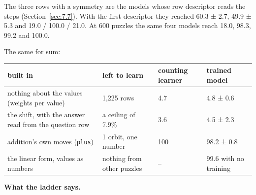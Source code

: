 The three rows with a symmetry are the models whose row descriptor reads the steps (Section~\ref{sec:7.7}). With the first descriptor they reached 60.3 ± 2.7, 49.9 ± 5.3 and 19.0 / 100.0 / 21.0. At 600 puzzles the same four models reach 18.0, 98.3, 99.2 and 100.0.

The same for sum:

\begin{center}\small
\begin{tabularx}{\linewidth}{@{}YYlY@{}}
\toprule
built in & left to learn & counting learner & trained model \\
\midrule
nothing about the values (weights per value) & 1,225 rows & 4.7 & 4.8 ± 0.6 \\
the shift, with the answer read from the question row & a ceiling of 7.9\% & 3.6 & 4.5 ± 2.3 \\
addition's own moves (\texttt{plus}) & 1 orbit, one number & 100 & 98.2 ± 0.8 \\
the linear form, values as numbers & nothing from other puzzles & – & 99.6 with no training \\
\bottomrule
\end{tabularx}
\end{center}

\textbf{What the ladder says.}

